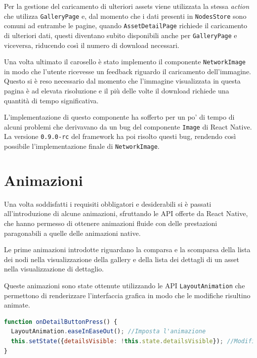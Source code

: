 Per la gestione del caricamento di ulteriori assets viene utilizzata la stessa \textit{action} che utilizza \texttt{GalleryPage} e, dal momento che i dati presenti in \texttt{NodesStore} sono comuni ad entrambe le pagine, quando \texttt{AssetDetailPage} richiede il caricamento di ulteriori dati, questi diventano subito disponibili anche per \texttt{GalleryPage} e viceversa, riducendo così il numero di download necessari.

Una volta ultimato il carosello è stato implemento il componente \texttt{NetworkImage} in modo che l'utente ricevesse un feedback riguardo il caricamento dell'immagine.
Questo si è reso necessario dal momento che l'immagine visualizzata in questa pagina è ad elevata risoluzione e il più delle volte il download richiede una quantità di tempo significativa.

L'implementazione di questo componente ha sofferto per un po' di tempo di alcuni problemi che derivavano da un bug del componente \texttt{Image} di React Native.
La versione \texttt{0.9.0-rc} del framework ha poi risolto questi bug, rendendo così possibile l'implementazione finale di \texttt{NetworkImage}.


\section{Animazioni}

Una volta soddisfatti i requisiti obbligatori e desiderabili si è passati all'introduzione di alcune animazioni, sfruttando le API offerte da React Native, che hanno permesso di ottenere animazioni fluide con delle prestazioni paragonabili a quelle delle animazioni native.

Le prime animazioni introdotte riguardano la comparsa e la scomparsa della lista dei nodi nella visualizzazione della gallery e della lista dei dettagli di un asset nella visualizzazione di dettaglio.

Queste animazioni sono state ottenute utilizzando le API \texttt{LayoutAnimation} che permettono di renderizzare l'interfaccia grafica in modo che le modifiche risultino animate.

\begin{lstlisting}[language=JavaScript, caption=AssetDetailPage - Animazione della comparsa/scomparsa lista dei dettagli]
function onDetailButtonPress() {
  LayoutAnimation.easeInEaseOut(); //Imposta l'animazione
  this.setState({detailsVisible: !this.state.detailsVisible}); //Modifica lo stato del componente causandone il re-rendering
}
\end{lstlisting}

